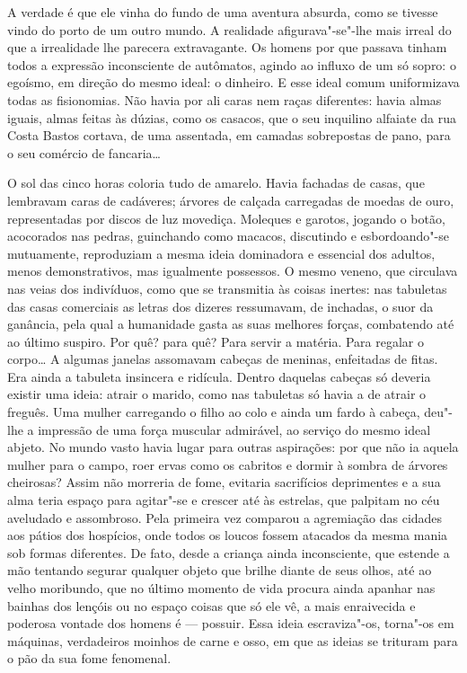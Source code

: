 A verdade é que ele vinha do fundo de uma aventura absurda, como se
tivesse vindo do porto de um outro mundo. A realidade afigurava"-se"-lhe
mais irreal do que a irrealidade lhe parecera extravagante. Os homens
por que passava tinham todos a expressão inconsciente de autômatos,
agindo ao influxo de um só sopro: o egoísmo, em direção do mesmo ideal:
o dinheiro. E esse ideal comum uniformizava todas as fisionomias. Não
havia por ali caras nem raças diferentes: havia almas iguais, almas
feitas às dúzias, como os casacos, que o seu inquilino alfaiate da rua
Costa Bastos cortava, de uma assentada, em camadas sobrepostas de pano,
para o seu comércio de fancaria\ldots{}

O sol das cinco horas coloria tudo de amarelo. Havia fachadas de casas,
que lembravam caras de cadáveres; árvores de calçada carregadas de
moedas de ouro, representadas por discos de luz movediça. Moleques e
garotos, jogando o botão, acocorados nas pedras, guinchando como
macacos, discutindo e esbordoando"-se mutuamente, reproduziam a mesma
ideia dominadora e essencial dos adultos, menos demonstrativos, mas
igualmente possessos. O mesmo veneno, que circulava nas veias dos
indivíduos, como que se transmitia às coisas inertes: nas tabuletas das
casas comerciais as letras dos dizeres ressumavam, de inchadas, o suor
da ganância, pela qual a humanidade gasta as suas melhores forças,
combatendo até ao último suspiro. Por quê? para quê? Para servir a
matéria. Para regalar o corpo\ldots{} A algumas janelas assomavam cabeças de
meninas, enfeitadas de fitas. Era ainda a tabuleta insincera e ridícula.
Dentro daquelas cabeças só deveria existir uma ideia: atrair o marido,
como nas tabuletas só havia a de atrair o freguês. Uma mulher carregando
o filho ao colo e ainda um fardo à cabeça, deu"-lhe a impressão de uma
força muscular admirável, ao serviço do mesmo ideal abjeto. No mundo
vasto havia lugar para outras aspirações: por que não ia aquela mulher
para o campo, roer ervas como os cabritos e dormir à sombra de árvores
cheirosas? Assim não morreria de fome, evitaria sacrifícios deprimentes
e a sua alma teria espaço para agitar"-se e crescer até às estrelas, que
palpitam no céu aveludado e assombroso. Pela primeira vez comparou a
agremiação das cidades aos pátios dos hospícios, onde todos os loucos
fossem atacados da mesma mania sob formas diferentes. De fato, desde a
criança ainda inconsciente, que estende a mão tentando segurar qualquer
objeto que brilhe diante de seus olhos, até ao velho moribundo, que no
último momento de vida procura ainda apanhar nas bainhas dos lençóis ou
no espaço coisas que só ele vê, a mais enraivecida e poderosa vontade
dos homens é --- possuir. Essa ideia escraviza"-os, torna"-os em máquinas,
verdadeiros moinhos de carne e osso, em que as ideias se trituram para o
pão da sua fome fenomenal.

